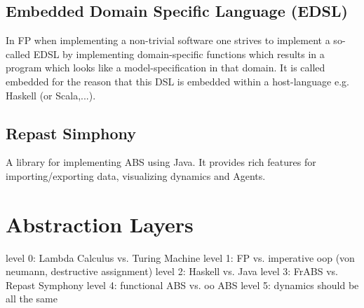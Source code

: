 \documentclass[oneside]{book}
\begin{document}
\section*{Embedded Domain Specific Language (EDSL)}
In FP when implementing a non-trivial software one strives to implement a so-called EDSL by implementing domain-specific functions which results in a program which looks like a model-specification in that domain. It is called embedded for the reason that this DSL is embedded within a host-language e.g. Haskell (or Scala,...).

\section*{Repast Simphony}
A library for implementing ABS using Java. It provides rich features for importing/exporting data, visualizing dynamics and Agents.

\centering



\chapter{Abstraction Layers}
level 0: Lambda Calculus vs. Turing Machine
level 1: FP vs. imperative oop (von neumann, destructive assignment)
level 2: Haskell vs. Java
level 3: FrABS vs. Repast Symphony
level 4: functional ABS vs. oo ABS
level 5: dynamics should be all the same
\end{document}
